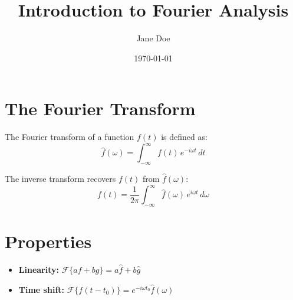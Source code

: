 \documentclass[12pt]{article}
\title{Introduction to Fourier Analysis}
\author{Jane Doe}
\date{\today}
\begin{document}
\maketitle

\section{The Fourier Transform}
The Fourier transform of a function $f(t)$ is defined as:
\begin{equation}
    \hat{f}(\omega) = \int_{-\infty}^{\infty} f(t) \, e^{-i\omega t} \, dt
\end{equation}

The inverse transform recovers $f(t)$ from $\hat{f}(\omega)$:
\begin{equation}
    f(t) = \frac{1}{2\pi} \int_{-\infty}^{\infty} \hat{f}(\omega) \, e^{i\omega t} \, d\omega
\end{equation}

\section{Properties}
\begin{itemize}
    \item \textbf{Linearity:} $\mathcal{F}\{af + bg\} = a\hat{f} + b\hat{g}$
    \item \textbf{Time shift:} $\mathcal{F}\{f(t - t_0)\} = e^{-i\omega t_0}\hat{f}(\omega)$
\end{itemize}
\end{document}
